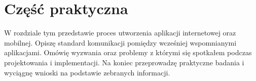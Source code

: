 \chapter{Część praktyczna}
W rozdziale tym przedstawie proces utworzenia aplikacji internetowej oraz mobilnej. Opiszę standard komunikacji pomiędzy wcześniej wspomnianymi aplikacjami. Omówię wyzwania oraz problemy z którymi się spotkałem podczas projektowania i implementacji. Na koniec przeprowadzę praktyczne badania i wyciągnę wnioski na podstawie zebranych informacji.
 
